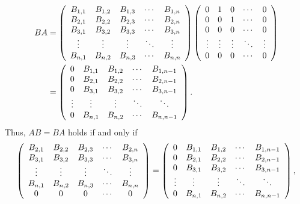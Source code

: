 \documentclass[numbers=enddot,12pt,final,onecolumn,notitlepage]{scrartcl}%
\numberwithin{exer}{subsection}
\theoremstyle{definition}
\begin{document}
\begin{align*}
BA  &  =\left(
\begin{array}
[c]{ccccc}%
B_{1,1} & B_{1,2} & B_{1,3} & \cdots & B_{1,n}\\
B_{2,1} & B_{2,2} & B_{2,3} & \cdots & B_{2,n}\\
B_{3,1} & B_{3,2} & B_{3,3} & \cdots & B_{3,n}\\
\vdots & \vdots & \vdots & \ddots & \vdots\\
B_{n,1} & B_{n,2} & B_{n,3} & \cdots & B_{n,n}%
\end{array}
\right)  \left(
\begin{array}
[c]{ccccc}%
0 & 1 & 0 & \cdots & 0\\
0 & 0 & 1 & \cdots & 0\\
0 & 0 & 0 & \cdots & 0\\
\vdots & \vdots & \vdots & \ddots & \vdots\\
0 & 0 & 0 & \cdots & 0
\end{array}
\right) \\
&  =\left(
\begin{array}
[c]{ccccc}%
0 & B_{1,1} & B_{1,2} & \cdots & B_{1,n-1}\\
0 & B_{2,1} & B_{2,2} & \cdots & B_{2,n-1}\\
0 & B_{3,1} & B_{3,2} & \cdots & B_{3,n-1}\\
\vdots & \vdots & \vdots & \ddots & \ddots\\
0 & B_{n,1} & B_{n,2} & \cdots & B_{n,n-1}%
\end{array}
\right)  .
\end{align*}
Thus, $AB=BA$ holds if and only if
\[
\left(
\begin{array}
[c]{ccccc}%
B_{2,1} & B_{2,2} & B_{2,3} & \cdots & B_{2,n}\\
B_{3,1} & B_{3,2} & B_{3,3} & \cdots & B_{3,n}\\
\vdots & \vdots & \vdots & \ddots & \vdots\\
B_{n,1} & B_{n,2} & B_{n,3} & \cdots & B_{n,n}\\
0 & 0 & 0 & \cdots & 0
\end{array}
\right)  =\left(
\begin{array}
[c]{ccccc}%
0 & B_{1,1} & B_{1,2} & \cdots & B_{1,n-1}\\
0 & B_{2,1} & B_{2,2} & \cdots & B_{2,n-1}\\
0 & B_{3,1} & B_{3,2} & \cdots & B_{3,n-1}\\
\vdots & \vdots & \vdots & \ddots & \ddots\\
0 & B_{n,1} & B_{n,2} & \cdots & B_{n,n-1}%
\end{array}
\right)  ,
\]
\end{document}

